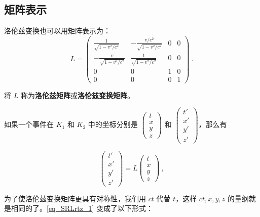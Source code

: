 \subsection{矩阵表示}

洛伦兹变换也可以用矩阵表示为：
\begin{equation}\label{eq_SRLrtz_4}
L=
\left(\begin{matrix}
\frac{1}{\sqrt{1-v^2/c^2}}& -\frac{v/c^2}{\sqrt{1-v^2/c^2}}& 0& 0\\
-\frac{v}{\sqrt{1-v^2/c^2}}& \frac{1}{\sqrt{1-v^2/c^2}}& 0& 0\\
0&0&1&0\\
0&0&0&1
\end{matrix}\right)~.
\end{equation}

将 $L$ 称为\textbf{洛伦兹矩阵}或\textbf{洛伦兹变换矩阵}。

如果一个事件在 $K_1$ 和 $K_2$ 中的坐标分别是 $\left(\begin{matrix}   t\\x\\y\\z    \end{matrix}\right)$ 和 $\left(\begin{matrix}   t'\\x'\\y'\\z'    \end{matrix}\right)$，那么有

\begin{equation}
\left(\begin{matrix}   t'\\x'\\y'\\z'    \end{matrix}\right)
=
L
\left(\begin{matrix}   t\\x\\y\\z    \end{matrix}\right)~,
\end{equation}

为了使洛伦兹变换矩阵更具有对称性，我们用 $ct$ 代替 $t$，这样 $ct,x,y,z$ 的量纲就是相同的了。\autoref{eq_SRLrtz_1} 变成了以下形式：

